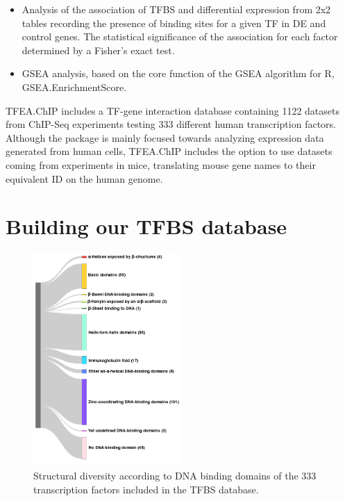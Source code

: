 \documentclass[a4paper, 12pt ]{article}
\begin{document}
\begin{itemize}
 \item Analysis of the association of TFBS and differential expression from 2x2 tables recording the presence of binding sites for a given TF in DE and control genes. The statistical significance of the association for each factor determined by a Fisher’s exact test.
 
 \item GSEA analysis, based on the core function of the GSEA algorithm for R\cite{GSEA1}\cite{GSEA2}, GSEA.EnrichmentScore.
\end{itemize}

TFEA.ChIP includes a TF-gene interaction database containing 1122 datasets from ChIP-Seq experiments testing 333 different human transcription factors. Although the package is mainly focused towards analyzing expression data generated from human cells, TFEA.ChIP includes the option to use datasets coming from experiments in mice, translating mouse gene names to their equivalent ID on the human genome. 

\section{Building our TFBS database}

\begin{figure}
	\centering
	\includegraphics[width=0.5\textwidth]{superclases}
	 \caption{Structural diversity according to DNA binding domains of the 333 transcription factors included in the TFBS database.}
\end{figure}
\end{document}
